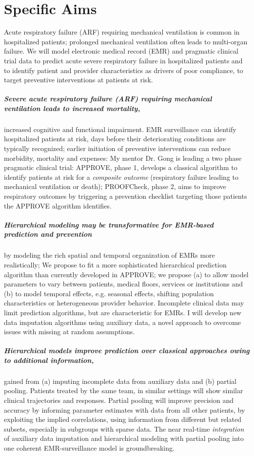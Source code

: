 \documentclass[11pt,notitlepage]{article}
\begin{document}
\section*{Specific Aims}
Acute respiratory failure (ARF) requiring mechanical ventilation is common in hospitalized patients; prolonged mechanical ventilation often leads to multi-organ failure. We will model electronic medical record (EMR) and pragmatic clinical trial data to predict acute severe respiratory failure in hospitalized patients and to identify patient and provider characteristics as drivers of poor compliance, to target preventive interventions at patients at risk.

\subparagraph{Severe acute respiratory failure (ARF) requiring mechanical ventilation leads to increased mortality,} increased cognitive and functional impairment. EMR surveillance can identify hospitalized patients at risk, days before their deteriorating conditions are typically recognized; earlier initiation of preventive interventions can reduce morbidity, mortality and expenses: My mentor Dr. Gong is leading a two phase pragmatic clinical trial: APPROVE, phase 1, develops a classical algorithm to identify patients at risk for a \textit{composite outcome} (respiratory failure leading to mechanical ventilation or death); PROOFCheck, phase 2, aims to improve respiratory outcomes by triggering a prevention checklist targeting those patients the APPROVE algorithm identifies. 

\subparagraph{Hierarchical modeling may be transformative for EMR-based prediction and prevention} by modeling the rich spatial and temporal organization of EMRs more realistically; We propose to fit a more sophisticated hierarchical prediction algorithm than currently developed in APPROVE; we propose (a) to allow model parameters to vary between patients, medical floors, services or institutions and (b) to model temporal effects, e.g. seasonal effects, shifting population characteristics or heterogeneous provider behavior. Incomplete clinical data may limit prediction algorithms, but are characteristic for EMRs. I will develop new data imputation algorithms using auxiliary data, a novel approach to overcome issues with missing at random assumptions. 

\subparagraph{Hierarchical models improve prediction over classical approaches owing to additional information,} gained from (a) imputing incomplete data from auxiliary data and (b) partial pooling. Patients treated by the same team, in similar settings will show similar clinical trajectories and responses. Partial pooling will improve precision and accuracy by informing parameter estimates with data from all other patients,  by exploiting the implied correlations, using information from different but related subsets, especially in subgroups with sparse data. The near real-time \textit{integration} of auxiliary data imputation and hierarchical modeling with partial pooling into one coherent EMR-surveillance model is groundbreaking. 
\end{document}
